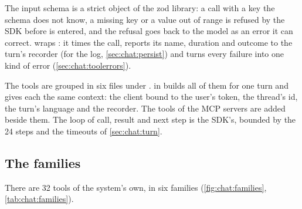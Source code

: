 The input schema is a strict object of the zod library: a call with a key the schema does not
know, a missing key or a value out of range is refused by the SDK before  is entered,
and the refusal goes back to the model as an error it can correct.  wraps
: it times the call, reports its name, duration and outcome to the turn's recorder
(for the log, \cref{sec:chat:persist}) and turns every failure into one kind of error
(\cref{sec:chat:toolerrors}).

The tools are grouped in six files under .  in
 builds all of them for one turn and gives each the same context: the
client bound to the user's token, the thread's id, the turn's language and the recorder. The
tools of the MCP servers are added beside them. The loop of call, result and next step is the
SDK's, bounded by the 24 steps and the timeouts of \cref{sec:chat:turn}.

\subsection{The families}\label{sec:chat:families}

There are 32 tools of the system's own, in six families (\cref{fig:chat:families},
\cref{tab:chat:families}).

